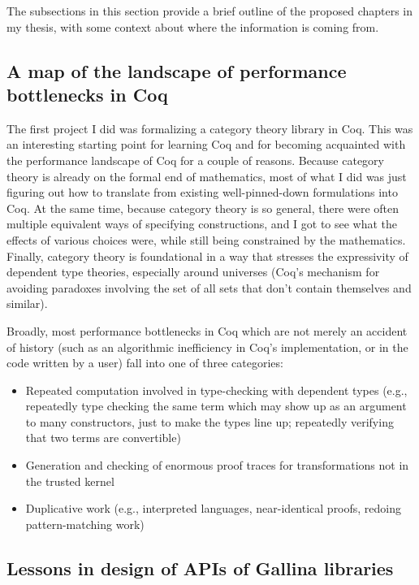 \documentclass[twoside]{article}
\begin{document}
The subsections in this section provide a brief outline of the proposed chapters in my thesis, with some context about where the information is coming from.

\subsection{A map of the landscape of performance bottlenecks in Coq}

The first project I did was formalizing a category theory library in Coq.
This was an interesting starting point for learning Coq and for becoming acquainted with the performance landscape of Coq for a couple of reasons.
Because category theory is already on the formal end of mathematics, most of what I did was just figuring out how to translate from existing well-pinned-down formulations into Coq.
At the same time, because category theory is so general, there were often multiple equivalent ways of specifying constructions, and I got to see what the effects of various choices were, while still being constrained by the mathematics.
Finally, category theory is foundational in a way that stresses the expressivity of dependent type theories, especially around universes (Coq's mechanism for avoiding paradoxes involving the set of all sets that don't contain themselves and similar).

Broadly, most performance bottlenecks in Coq which are not merely an accident of history (such as an algorithmic inefficiency in Coq's implementation, or in the code written by a user) fall into one of three categories:
\begin{itemize}
\item
  Repeated computation involved in type-checking with dependent types (e.g., repeatedly type checking the same term which may show up as an argument to many constructors, just to make the types line up; repeatedly verifying that two terms are convertible)
\item
  Generation and checking of enormous proof traces for transformations not in the trusted kernel
\item
  Duplicative work (e.g., interpreted languages, near-identical proofs, redoing pattern-matching work)
\end{itemize}


\subsection{Lessons in design of APIs of Gallina libraries}
\end{document}
